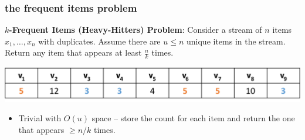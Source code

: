 \documentclass[]{beamer}
\begin{document}
	\begin{frame}
		\frametitle{the frequent items problem}
		\small
		\textbf{$k$-Frequent Items (Heavy-Hitters) Problem}: Consider a stream of $n$ items $x_1,\ldots, x_n$ with duplicates. Assume there are $u\leq n$ unique items in the stream. Return any item that appears at least $\frac{n}{k}$ times.
		\begin{center}
			\includegraphics[width=.95\textwidth]{fi.png}
		\end{center}
		\vspace{-.5em}
		\begin{itemize}
			\vspace{.5em}
			\item Trivial with $O(u)$ space -- store the count for each item and return the one that appears $\ge n/k$ times.
		\end{itemize}
		
	\end{frame}
	
\end{document}

